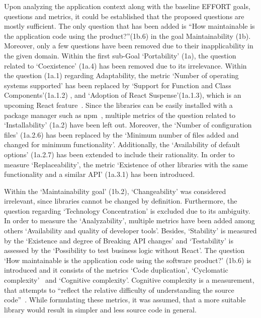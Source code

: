 %
%
%
%
%

Upon analyzing the application context along with the baseline EFFORT
goals, questions and metrics, it could be established that the proposed
questions are mostly sufficient. The only question that has been added is
``How maintainable is the application code using the product?''(1b.6) in the
goal Maintainability (1b). Moreover, only
a few questions have been removed due to their inapplicability in the
given domain.
Within the first sub-Goal `Portability' (1a), the question related to
`Coexistence' (1a.4) has been removed due to its irrelevance. Within the
question (1a.1) regarding Adaptability, the metric `Number of operating systems supported' has
been replaced by `Support for Function and Class Components'(1a.1.2) ,
and `Adoption of React Suspense'(1a.1.3), which is an upcoming React
feature~\cite{react_suspense}. Since the libraries can be easily installed with a
package manager such as npm~\cite{npm}, multiple metrics of the question related to
`Installability' (1a.2) have been left out.
Moreover, the `Number of configuration files' (1a.2.6) has been replaced
by the `Minimum number of files added and changed for minimum
functionality'. Additionally, the `Availability of default options'
(1a.2.7) has been extended to include their rationality. In order to
measure `Replaceability', the metric `Existence of other libraries with
the same functionality and a similar API' (1a.3.1) has been introduced.

Within the `Maintainability goal' (1b.2), `Changeability' was considered
irrelevant, since libraries cannot be changed by definition.
Furthermore, the question regarding `Technology Concentration' is
excluded due to its ambiguity. In order to measure the `Analyzability',
multiple metrics have been added among others `Availability and quality
of developer tools'. Besides, `Stability' is measured by the `Existence
and degree of Breaking API changes' and `Testability' is assessed by the
`Possibility to test business logic without React'. The question `How
maintainable is the application code using the software product?' (1b.6)
is introduced and it consists of the metrics `Code duplication',
`Cyclomatic complexity'~\cite{cyclomatic_complexity} and `Cognitive complexity'\cite{cognitive_complexity}. Cognitive
complexity is a measurement, that attempts to ``reflect the relative
difficulty of understanding the source code''~\cite{cognitive_complexity}. While formulating these metrics, it was assumed, that a
more suitable library would result in simpler and less source code in
general.

